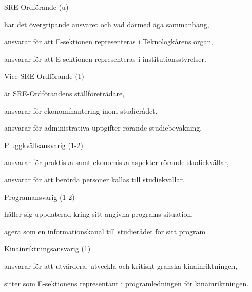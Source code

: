 \documentclass[10pt]{article}
\begin{document}
\begin{emptylist}
    \item SRE-Ordförande (u)
        \begin{dashlist}
            \item har det övergripande ansvaret och vad därmed äga
                sammanhang,
            \item ansvarar för att E-sektionen representeras i
                Teknologkårens organ,
            \item ansvarar för att E-sektionen representeras i
                institutionsstyrelser.
        \end{dashlist}
    \item Vice SRE-Ordförande (1)
        \begin{dashlist}
            \item är SRE-Ordförandens ställföreträdare,
            \item ansvarar för ekonomihantering inom studierådet,
            \item ansvarar för administrativa uppgifter rörande
                studiebevakning.
        \end{dashlist}
    \item Pluggkvällsansvarig (1-2)
        \begin{dashlist}
            \item ansvarar för praktiska samt ekonomiska aspekter
                rörande studiekvällar,
            \item ansvarar för att berörda personer kallas till
                studiekvällar.
        \end{dashlist}
    \item Programansvarig (1-2)
        \begin{dashlist}
            \item håller sig uppdaterad kring sitt angivna programs situation,
            \item agera som en informationskanal till studierådet för sitt program
        \end{dashlist}
    \item Kinainriktningsansvarig (1)
        \begin{dashlist}
            \item ansvarar för att utvärdera, utveckla och kritiskt
                granska kinainriktningen,
            \item sitter som E-sektionens representant i
                programledningen för kinainriktningen.
        \end{dashlist}

\end{emptylist}
\end{document}
